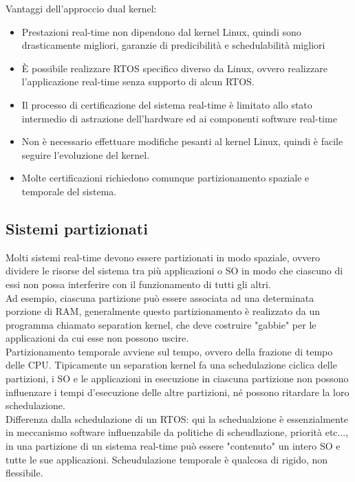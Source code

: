 \documentclass{article}
\begin{document}
Vantaggi dell'approccio dual kernel:
\begin{itemize}
\item Prestazioni real-time non dipendono dal kernel Linux, quindi sono drasticamente migliori, garanzie di predicibilità e schedulabilità migliori
\item È possibile realizzare RTOS specifico diverso da Linux, ovvero realizzare l'applicazione real-time senza supporto di alcun RTOS.
\item Il processo di certificazione del sistema real-time è limitato allo stato intermedio di astrazione dell'hardware ed ai componenti software real-time
\item Non è necessario effettuare modifiche pesanti al kernel Linux, quindi è facile seguire l'evoluzione del kernel.
\item Molte certificazioni richiedono comunque partizionamento spaziale e temporale del sistema.
\end{itemize}
\subsection{Sistemi partizionati}
Molti sistemi real-time devono essere partizionati in modo spaziale, ovvero dividere le risorse del sistema tra più applicazioni o SO in modo che ciascuno di essi non possa interferire con il funzionamento di tutti gli altri.\\ Ad esempio, ciascuna partizione può essere associata ad una determinata porzione di RAM, generalmente questo partizionamento è realizzato da un programma chiamato separation kernel, che deve costruire "gabbie" per le applicazioni da cui esse non possono uscire. \\ Partizionamento temporale avviene sul tempo, ovvero della frazione di tempo delle CPU. Tipicamente un separation kernel fa una schedulazione ciclica delle partizioni, i SO e le applicazioni in esecuzione in ciascuna partizione non possono influenzare i tempi d'esecuzione delle altre partizioni, né possono ritardare la loro schedulazione.\\ Differenza dalla schedulazione di un RTOS: qui la schedualzione è essenzialmente in meccanismo software influenzabile da politiche di scheudlazione, priorità etc..., in una partizione di un sistema real-time può essere "contenuto" un intero SO e tutte le sue applicazioni. Scheudulazione temporale è qualcosa di rigido, non flessibile.
\end{document}
